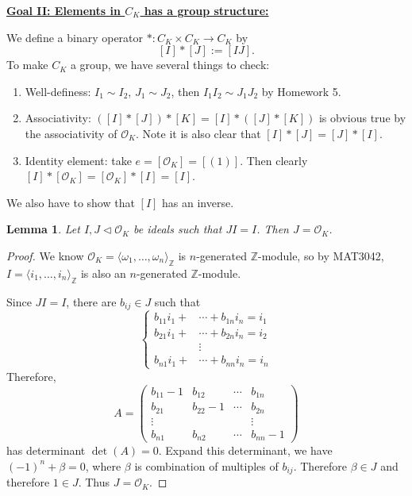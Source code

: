 \documentclass[11pt]{book}
\newtheorem{lemma}[theorem]{Lemma}
\begin{document}
\noindent \underline{\bf Goal II: Elements in $C_{K}$ has a group structure:} 

We define a binary operator $*:C_{K}\times C_{K}\to C_{K}$ by 
    \[ 
    [I]*[J]:=[IJ].
    \]
To make $C_{K}$ a group, we have several things to check: 
\begin{enumerate}
    \item Well-definess: $I_{1}\sim I_{2}$, $J_{1}\sim J_{2}$, then $I_{1}I_{2}\sim J_{1}J_{2}$ by Homework 5. 
    \item Associativity: $([I]*[J])*[K]=[I]*([J]*[K])$ is obvious true by the associativity of $\mathcal{O}_{K}$. Note it is also clear that $[I]*[J]=[J]*[I]$. 
    \item Identity element: take $e=[\mathcal{O}_{K}]=[(1)]$. Then clearly $[I]*[\mathcal{O}_{K}]=[\mathcal{O}_{K}]*[I]=[I]$. 
\end{enumerate}

We also have to show that $[I]$ has an inverse. 

\begin{lemma}\label{lem-idealCancelation}
    Let $I,J\lhd \mathcal{O}_{K}$ be ideals such that $JI=I$. Then $J=\mathcal{O}_{K}$. 
\end{lemma}

\begin{proof}
    We know $\mathcal{O}_{K}=\langle \omega_{1},\dots, \omega_{n}\rangle_{\mathbb{Z}}$ is $n$-generated $\mathbb{Z}$-module, so by MAT3042, $I=\langle i_{1},\dots,i_{n}\rangle_{\mathbb{Z}}$ is also an $n$-generated $\mathbb{Z}$-module. 
    
    Since $JI=I$, there are $b_{ij}\in J$ such that 
    \[
    \left\{
        \begin{aligned}
            b_{11}i_{1}+&\cdots+b_{1n}i_{n}=i_{1}\\
            b_{21}i_{1}+&\cdots+b_{2n}i_{n}=i_{2}\\
            &\vdots\\
            b_{n1}i_{1}+&\cdots+b_{nn}i_{n}=i_{n}
        \end{aligned}
    \right.
    \]
    Therefore, 
    \[
    A=\begin{pmatrix}
        b_{11}-1& b_{12}&\cdots & b_{1n}\\
        b_{21}&b_{22}-1&\cdots & b_{2n}\\
        \vdots& &&\vdots\\
        b_{n1}&b_{n2}&\cdots &b_{nn}-1
    \end{pmatrix}
    \]
    has determinant $\det (A)=0$. Expand this determinant, we have $(-1)^{n}+\beta=0$, where $\beta$ is combination of multiples of $b_{ij}$. Therefore $\beta\in J$ and therefore $1\in J$. Thus $J=\mathcal{O}_{K}$. 
\end{proof}
\end{document}
